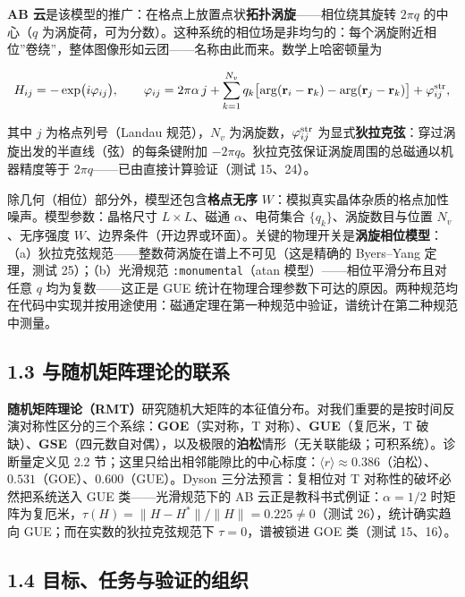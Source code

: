 \documentclass[
]{article}
\begin{document}
\textbf{AB
云}是该模型的推广：在格点上放置点状\textbf{拓扑涡旋}------相位绕其旋转
\(2\pi q\) 的中心（\(q\)
为涡旋荷，可为分数）。这种系统的相位场是非均匀的：每个涡旋附近相位''卷绕''，整体图像形如云团------名称由此而来。数学上哈密顿量为

\[H_{ij} = -\exp\bigl(i\varphi_{ij}\bigr),\qquad \varphi_{ij} = 2\pi\alpha\,j + \sum_{k=1}^{N_v} q_k\bigl[\arg(\mathbf r_i - \mathbf r_k) - \arg(\mathbf r_j - \mathbf r_k)\bigr] + \varphi^{\rm str}_{ij},\]

其中 \(j\) 为格点列号（Landau 规范），\(N_v\)
为涡旋数，\(\varphi^{\rm str}_{ij}\)
为显式\textbf{狄拉克弦}：穿过涡旋出发的半直线（弦）的每条键附加
\(-2\pi q\)。狄拉克弦保证涡旋周围的总磁通以机器精度等于
\(2\pi q\)------已由直接计算验证（测试 15、24）。

除几何（相位）部分外，模型还包含\textbf{格点无序}
\(W\)：模拟真实晶体杂质的格点加性噪声。模型参数：晶格尺寸
\(L\times L\)、磁通 \(\alpha\)、电荷集合 \(\{q_k\}\)、涡旋数目与位置
\(N_v\)、无序强度
\(W\)、边界条件（开边界或环面）。关键的物理开关是\textbf{涡旋相位模型}：（a）狄拉克弦规范------整数荷涡旋在谱上不可见（这是精确的
Byers--Yang 定理，测试 25）；（b）光滑规范 \texttt{:monumental}（atan
模型）------相位平滑分布且对任意 \(q\) 均为复数------这正是 GUE
统计在物理合理参数下可达的原因。两种规范均在代码中实现并按用途使用：磁通定理在第一种规范中验证，谱统计在第二种规范中测量。

\subsection{1.3
与随机矩阵理论的联系}\label{ux4e0eux968fux673aux77e9ux9635ux7406ux8bbaux7684ux8054ux7cfb}

\textbf{随机矩阵理论（RMT）}研究随机大矩阵的本征值分布。对我们重要的是按时间反演对称性区分的三个系综：\textbf{GOE}（实对称，T
对称）、\textbf{GUE}（复厄米，T
破缺）、\textbf{GSE}（四元数自对偶），以及极限的\textbf{泊松}情形（无关联能级；可积系统）。诊断量定义见
2.2
节；这里只给出相邻能隙比的中心标度：\(\langle r\rangle \approx 0.386\)（泊松）、\(0.531\)（GOE）、\(0.600\)（GUE）。Dyson
三分法预言：复相位对 T 对称性的破坏必然把系统送入 GUE
类------光滑规范下的 AB 云正是教科书式例证：\(\alpha = 1/2\)
时矩阵为复厄米，\(\tau(H) = \|H-H^*\|/\|H\| = 0.225 \neq 0\)（测试
26），统计确实趋向 GUE；而在实数的狄拉克弦规范下 \(\tau = 0\)，谱被锁进
GOE 类（测试 15、16）。

\subsection{1.4
目标、任务与验证的组织}\label{ux76eeux6807ux4efbux52a1ux4e0eux9a8cux8bc1ux7684ux7ec4ux7ec7}
\end{document}
